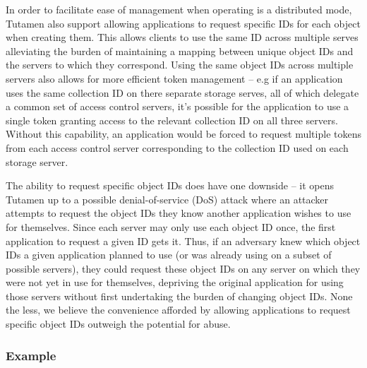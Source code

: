 In order to facilitate ease of management when operating is a
distributed mode, Tutamen also support allowing applications to
request specific IDs for each object when creating them. This allows
clients to use the same ID across multiple serves alleviating the
burden of maintaining a mapping between unique object IDs and the
servers to which they correspond. Using the same object IDs across
multiple servers also allows for more efficient token management --
e.g if an application uses the same collection ID on there separate
storage serves, all of which delegate a common set of access control
servers, it's possible for the application to use a single token
granting access to the relevant collection ID on all three
servers. Without this capability, an application would be forced to
request multiple tokens from each access control server corresponding
to the collection ID used on each storage server.

The ability to request specific object IDs does have one downside --
it opens Tutamen up to a possible denial-of-service (DoS) attack where
an attacker attempts to request the object IDs they know another
application wishes to use for themselves. Since each server may only
use each object ID once, the first application to request a given ID
gets it. Thus, if an adversary knew which object IDs a given
application planned to use (or was already using on a subset of
possible servers), they could request these object IDs on any server
on which they were not yet in use for themselves, depriving the
original application for using those servers without first undertaking
the burden of changing object IDs. None the less, we believe the
convenience afforded by allowing applications to request specific
object IDs outweigh the potential for abuse.





\subsubsection{Example}

